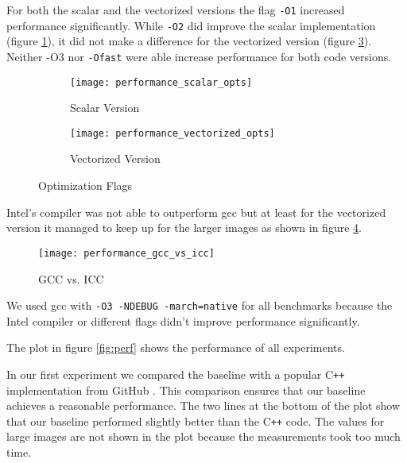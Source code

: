 For both the scalar and the vectorized versions the flag \texttt{-O1} increased
performance significantly. While \texttt{-O2} did improve the scalar
implementation (figure \ref{fig:perf_scal}), it did not make a difference for
the vectorized version (figure \ref{fig:perf_vec}). Neither \textsc{-O3} nor
\texttt{-Ofast} were able increase performance for both code versions.

\begin{figure}
  \begin{subfigure}[t]{\linewidth}
    \centering
    \texttt{[image: performance\_scalar\_opts]}
    \caption{Scalar Version}
    \label{fig:perf_scal}
  \end{subfigure}
  \begin{subfigure}[b]{\linewidth}
    \centering
    \texttt{[image: performance\_vectorized\_opts]}
    \caption{Vectorized Version}
    \label{fig:perf_vec}
  \end{subfigure}
  \caption{Optimization Flags}
\end{figure}


Intel's compiler was not able to outperform gcc but at least for the vectorized
version it managed to keep up for the larger images as shown in figure
\ref{fig:perf_gcc_vs_icc}.

\begin{figure}
  \centering
  \texttt{[image: performance\_gcc\_vs\_icc]}
  \caption{GCC vs. ICC}
  \label{fig:perf_gcc_vs_icc}
\end{figure}

We used gcc with \verb|-O3 -NDEBUG -march=native| for all benchmarks because the
Intel compiler or different flags didn't improve performance significantly.

 The plot in figure \ref{fig:perf} shows the performance of all
experiments.

In our first experiment we compared the baseline with a popular C\texttt{++} 
implementation from GitHub \cite{github-cpp}. This comparison ensures that our baseline
achieves a reasonable performance. The two lines at the bottom of the plot
show that our baseline performed slightly better than the C\texttt{++} code. The values for large
images are not shown in the plot because the measurements took too much time.

